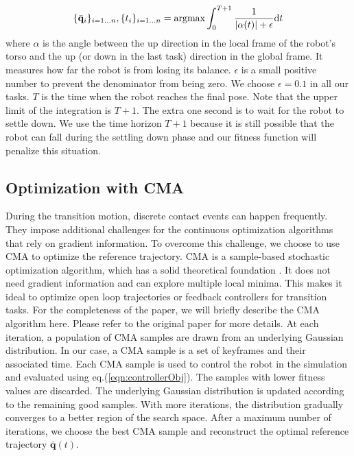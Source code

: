 \begin{equation}
  \{\bar{\mathbf{q}}_i\}_{i=1...n}, \{{t}_i\}_{i=1...n}=\argmax\int_0^{T+1} \frac{1}{|\alpha(t)|+\epsilon}\mathrm{d}t
  \label{eqn:controllerObj}
\end{equation}
where $\alpha$ is the angle between the up direction in the local frame of the robot's torso and the up (or down in the last task) direction in the global frame. It measures how far the robot is from losing its balance. $\epsilon$ is a small positive number to prevent the denominator from being zero. We choose $\epsilon=0.1$ in all our tasks. $T$ is the time when the robot reaches the final pose. Note that the upper limit of the integration is $T+1$. The extra one second is to wait for the robot to settle down. We use the time horizon $T+1$ because it is still possible that the robot can fall during the settling down phase and our fitness function will penalize this situation.

\subsection{Optimization with CMA}
During the transition motion, discrete contact events can happen frequently. They impose additional challenges for the continuous optimization algorithms that rely on gradient information. To overcome this challenge, we choose to use CMA to optimize the reference trajectory. CMA is a sample-based stochastic optimization algorithm, which has a solid theoretical foundation \cite{akimoto:2010,glasmachers:2010}. It does not need gradient information and can explore multiple local minima. This makes it ideal to optimize open loop trajectories or feedback controllers for transition tasks. For the completeness of the paper, we will briefly describe the CMA algorithm here. Please refer to the original paper \cite{Hansen:2009} for more details. At each iteration, a population of CMA samples are drawn from an underlying Gaussian distribution. In our case, a CMA sample is a set of keyframes and their associated time. Each CMA sample is used to control the robot in the simulation and evaluated using eq.(\ref{eqn:controllerObj}). The samples with lower fitness values are discarded. The underlying Gaussian distribution is updated according to the remaining good samples. With more iterations, the distribution gradually converges to a better region of the search space. After a maximum number of iterations, we choose the best CMA sample and reconstruct the optimal reference trajectory $\bar{\mathbf{q}}(t)$.
